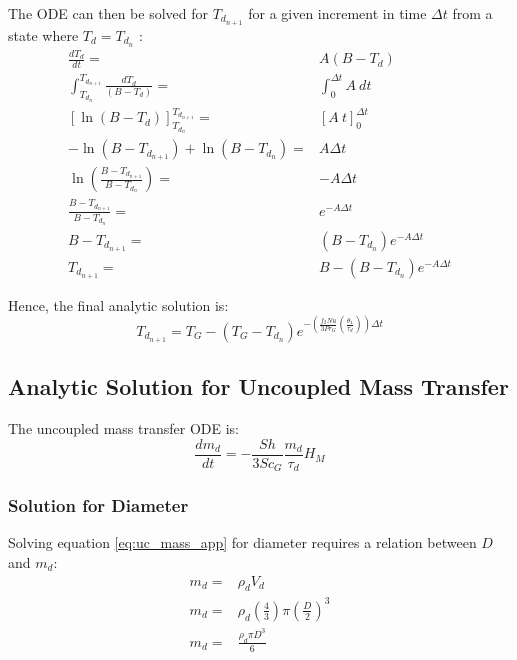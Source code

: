 \documentclass[../Interim_Report_Master]{subfiles}
\begin{document}
The ODE can then be solved for $T_{d_{n+1}}$ for a given increment in time $\Delta t$ from a state where $T_d=T_{d_{n}}$ :
\begin{subequations}
\begin{align}
\frac{dT_{d}}{dt} =& A(B-T_{d}) \\
\int_{T_{d_{n}}}^{T_{d_{n+1}}} \frac{dT_d}{(B-T_d)} =& \int_{0}^{\Delta t} A~dt \\
\left[\ln(B-T_{d})\right]_{T_{d_{n}}}^{T_{d_{n+1}}} =& \left[A~t\right]_{0}^{\Delta t} \\
-\ln(B-T_{d_{n+1}}) + \ln(B-T_{d_{n}}) =& A \Delta t \\
\ln\left(\frac{B-T_{d_{n+1}}}{B-T_{d_{n}}}\right) =& -A \Delta t \\
\frac{B-T_{d_{n+1}}}{B-T_{d_{n}}} =& e^{-A \Delta t} \\
B-T_{d_{n+1}} =& (B-T_{d_{n}})e^{-A \Delta t} \\
T_{d_{n+1}} =& B - (B-T_{d_{n}})e^{-A \Delta t} 
\end{align}
\end{subequations}

Hence, the final analytic solution is:
\begin{equation}
T_{d_{n+1}} = T_G - (T_G-T_{d_{n}})e^{-\left(\frac{f_{2}Nu}{3Pr_{G}}\left(\frac{\theta_1}{\tau_d}\right)\right)\Delta t}
\end{equation}
\subsection{Analytic Solution for Uncoupled Mass Transfer}\label{uc_mass_dev}
The uncoupled mass transfer ODE is:
\begin{equation}
\frac{dm_d}{dt} = -\frac{Sh}{3Sc_G}\frac{m_d}{\tau_d}H_M
\label{eq:uc_mass_app}
\end{equation}

\subsubsection{Solution for Diameter}
Solving equation \ref{eq:uc_mass_app} for diameter requires a relation between $D$ and $m_d$:
\begin{subequations}
	\begin{align}
	m_d =& \rho_d V_d \\
	m_d =& \rho_d \left(\frac{4}{3}\right) \pi \left(\frac{D}{2}\right)^3 \\
	m_d =& \frac{\rho_d \pi D^3}{6}
	\end{align}
	\label{mass_diameter}
\end{subequations}
\end{document}

